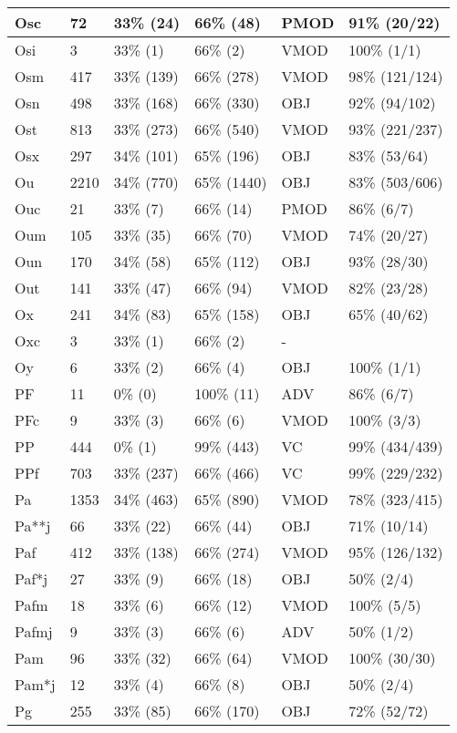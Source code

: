 \begin{figure*}
\begin{tabular}{|l|l|l|l||l|l|}
\hline
 Osc & 72 & 33\% (24) & 66\% (48) & PMOD & 91\% (20/22) \\ 
\hline
 Osi & 3 & 33\% (1) & 66\% (2) & VMOD & 100\% (1/1) \\ 
\hline
 Osm & 417 & 33\% (139) & 66\% (278) & VMOD & 98\% (121/124) \\ 
\hline
 Osn & 498 & 33\% (168) & 66\% (330) & OBJ & 92\% (94/102) \\ 
\hline
 Ost & 813 & 33\% (273) & 66\% (540) & VMOD & 93\% (221/237) \\ 
\hline
 Osx & 297 & 34\% (101) & 65\% (196) & OBJ & 83\% (53/64) \\ 
\hline
 Ou & 2210 & 34\% (770) & 65\% (1440) & OBJ & 83\% (503/606) \\ 
\hline
 Ouc & 21 & 33\% (7) & 66\% (14) & PMOD & 86\% (6/7) \\ 
\hline
 Oum & 105 & 33\% (35) & 66\% (70) & VMOD & 74\% (20/27) \\ 
\hline
 Oun & 170 & 34\% (58) & 65\% (112) & OBJ & 93\% (28/30) \\ 
\hline
 Out & 141 & 33\% (47) & 66\% (94) & VMOD & 82\% (23/28) \\ 
\hline
 Ox & 241 & 34\% (83) & 65\% (158) & OBJ & 65\% (40/62) \\ 
\hline
 Oxc & 3 & 33\% (1) & 66\% (2) & - &  \\ 
\hline
 Oy & 6 & 33\% (2) & 66\% (4) & OBJ & 100\% (1/1) \\ 
\hline
 PF & 11 & 0\% (0) & 100\% (11) & ADV & 86\% (6/7) \\ 
\hline
 PFc & 9 & 33\% (3) & 66\% (6) & VMOD & 100\% (3/3) \\ 
\hline
 PP & 444 & 0\% (1) & 99\% (443) & VC & 99\% (434/439) \\ 
\hline
 PPf & 703 & 33\% (237) & 66\% (466) & VC & 99\% (229/232) \\ 
\hline
 Pa & 1353 & 34\% (463) & 65\% (890) & VMOD & 78\% (323/415) \\ 
\hline
 Pa**j & 66 & 33\% (22) & 66\% (44) & OBJ & 71\% (10/14) \\ 
\hline
 Paf & 412 & 33\% (138) & 66\% (274) & VMOD & 95\% (126/132) \\ 
\hline
 Paf*j & 27 & 33\% (9) & 66\% (18) & OBJ & 50\% (2/4) \\ 
\hline
 Pafm & 18 & 33\% (6) & 66\% (12) & VMOD & 100\% (5/5) \\ 
\hline
 Pafmj & 9 & 33\% (3) & 66\% (6) & ADV & 50\% (1/2) \\ 
\hline
 Pam & 96 & 33\% (32) & 66\% (64) & VMOD & 100\% (30/30) \\ 
\hline
 Pam*j & 12 & 33\% (4) & 66\% (8) & OBJ & 50\% (2/4) \\ 
\hline
 Pg & 255 & 33\% (85) & 66\% (170) & OBJ & 72\% (52/72) \\ 
\hline
\end{tabular}
\end{figure*}
